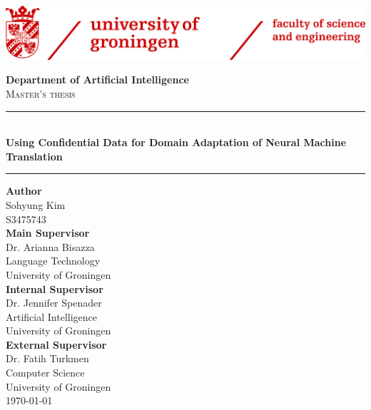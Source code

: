 \begin{titlepage}
    \begin{center}
        \vspace{0.5cm}
        
        \includegraphics[width=\textwidth]{images/banner.png}
        
        \vspace{1cm}
        
        \textbf{Department of Artificial Intelligence}\\
        \textsc{Master's thesis}
        
        \vspace{0.5cm}
        
        \LARGE
        \noindent\rule{15cm}{0.8pt} \\
        \textbf{Using Confidential Data for Domain Adaptation of Neural Machine Translation}
        \noindent\rule{15cm}{0.8pt}
        
        \vspace{2cm}
        
        \normalsize
        \textbf{Author}\\
        Sohyung Kim\\
        S3475743\\
        \vspace{0.5cm}
        \textbf{Main Supervisor}\\
        Dr. Arianna Bisazza \\
        Language Technology  \\
        University of Groningen \\
        \vspace{0.5cm}
        \textbf{Internal Supervisor}\\
        Dr. Jennifer Spenader \\
        Artificial Intelligence \\ 
        University of Groningen \\
        \textbf{External Supervisor}\\
        Dr. Fatih Turkmen \\
        Computer Science  \\
        University of Groningen \\
        
        
        \vfill
        \today
    \end{center}
\end{titlepage}